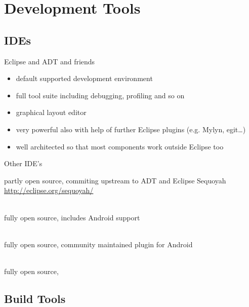 \documentclass[aspectratio=169]{beamer}
\newcommand{\surl}[1] {{\tiny \url{#1}}}
\begin{document}
\section{Development Tools}

  \subsection{IDEs}

    \begin{frame}{Eclipse and ADT and friends}
        \begin{itemize}
          \item<1-> default supported development environment 
          \item<2-> full tool suite including debugging, profiling and so on
          \item<3-> graphical layout editor
          \item<4-> very powerful also with help of further Eclipse plugins (e.g. Mylyn, egit\dots)
          \item<5-> well architected so that most components work outside Eclipse too
        \end{itemize}
    \end{frame}

    \begin{frame}{Other IDE's}
      \begin{description}
        \item<1->[Motorola MOTODEV Studio for Android \surl{http://developer.motorola.com/docstools/motodevstudio/}]  partly open source, commiting upstream to ADT and Eclipse Sequoyah \surl{http://eclipse.org/sequoyah/} 
        \item<2->[Jetbrains IntelliJ IDEA CE \surl{http://www.jetbrains.org/}] \hfill \\ fully open source, includes Android support 
        \item<3->[Oracle Netbeans \surl{http://kenai.com/projects/nbandroid/}] \hfill \\ fully open source, community maintained plugin for Android 
        \item<4->[Emacs \surl{http://gitorious.org/emacs-android-minor-mode}] \hfill \\ fully open source, 
      \end{description}
    \end{frame}

  \subsection{Build Tools}
\end{document}
